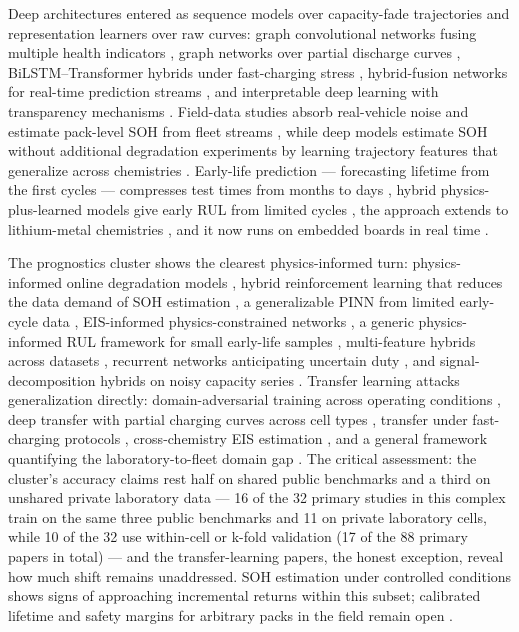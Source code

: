 \documentclass[journal]{IEEEtran}
\begin{document}
Deep architectures entered as sequence models over capacity-fade trajectories and representation learners over raw curves: graph convolutional networks fusing multiple health indicators \cite{r7}, graph networks over partial discharge curves \cite{r31}, BiLSTM--Transformer hybrids under fast-charging stress \cite{r8}, hybrid-fusion networks for real-time prediction streams \cite{r51}, and interpretable deep learning with transparency mechanisms \cite{r52}. Field-data studies absorb real-vehicle noise \cite{r6} and estimate pack-level SOH from fleet streams \cite{r53}, while deep models estimate SOH without additional degradation experiments by learning trajectory features that generalize across chemistries \cite{r54}. Early-life prediction --- forecasting lifetime from the first cycles --- compresses test times from months to days \cite{r3}\cite{r55}\cite{r56}, hybrid physics-plus-learned models give early RUL from limited cycles \cite{r57}, the approach extends to lithium-metal chemistries \cite{r58}, and it now runs on embedded boards in real time \cite{r59}.

The prognostics cluster shows the clearest physics-informed turn: physics-informed online degradation models \cite{r60}, hybrid reinforcement learning that reduces the data demand of SOH estimation \cite{r28}, a generalizable PINN from limited early-cycle data \cite{r61}, EIS-informed physics-constrained networks \cite{r62}, a generic physics-informed RUL framework for small early-life samples \cite{r63}, multi-feature hybrids across datasets \cite{r64}, recurrent networks anticipating uncertain duty \cite{r65}, and signal-decomposition hybrids on noisy capacity series \cite{r66}. Transfer learning attacks generalization directly: domain-adversarial training across operating conditions \cite{r11}, deep transfer with partial charging curves across cell types \cite{r12}, transfer under fast-charging protocols \cite{r67}, cross-chemistry EIS estimation \cite{r68}, and a general framework quantifying the laboratory-to-fleet domain gap \cite{r69}. The critical assessment: the cluster's accuracy claims rest half on shared public benchmarks and a third on unshared private laboratory data --- 16 of the 32 primary studies in this complex train on the same three public benchmarks and 11 on private laboratory cells, while 10 of the 32 use within-cell or k-fold validation (17 of the 88 primary papers in total) --- and the transfer-learning papers, the honest exception, reveal how much shift remains unaddressed. SOH estimation under controlled conditions shows signs of approaching incremental returns within this subset; calibrated lifetime and safety margins for arbitrary packs in the field remain open \cite{r2}\cite{r20}.
\end{document}
